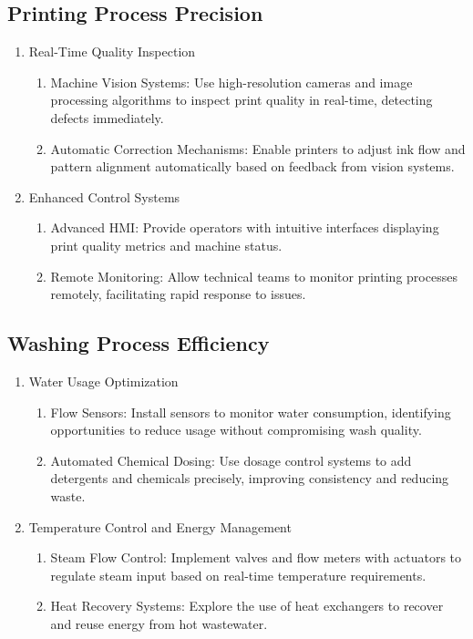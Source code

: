 \subsection{Printing Process Precision}
\begin{enumerate}
    \item Real-Time Quality Inspection
    \begin{enumerate}
        \item Machine Vision Systems: Use high-resolution cameras and image processing algorithms to inspect print quality in real-time, detecting defects immediately.
        \item Automatic Correction Mechanisms: Enable printers to adjust ink flow and pattern alignment automatically based on feedback from vision systems.
    \end{enumerate}
    \item Enhanced Control Systems
    \begin{enumerate}
        \item Advanced HMI: Provide operators with intuitive interfaces displaying print quality metrics and machine status.
        \item Remote Monitoring: Allow technical teams to monitor printing processes remotely, facilitating rapid response to issues.
    \end{enumerate}
\end{enumerate}

\subsection{Washing Process Efficiency}
\begin{enumerate}
    \item Water Usage Optimization
    \begin{enumerate}
        \item Flow Sensors: Install sensors to monitor water consumption, identifying opportunities to reduce usage without compromising wash quality.
        \item Automated Chemical Dosing: Use dosage control systems to add detergents and chemicals precisely, improving consistency and reducing waste.
    \end{enumerate}
    \item Temperature Control and Energy Management
    \begin{enumerate}
        \item Steam Flow Control: Implement valves and flow meters with actuators to regulate steam input based on real-time temperature requirements.
        \item Heat Recovery Systems: Explore the use of heat exchangers to recover and reuse energy from hot wastewater.
    \end{enumerate}
\end{enumerate}

